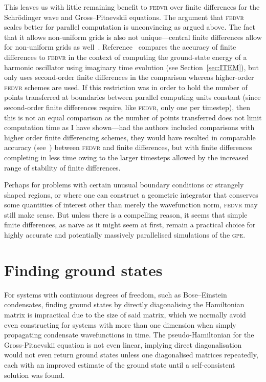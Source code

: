 This leaves us with little remaining benefit to \textsc{fedvr} over finite differences for the Schr\"odinger wave and Gross--Pitaevskii equations. The argument that \textsc{fedvr} scales better for parallel computation is unconvincing as argued above. The fact that it allows non-uniform grids is also not unique---central finite differences allow for non-uniform grids as well~\cite{fornberg_generation_1988}. Reference~\cite{schneider_parallel_2006} compares the accuracy of finite differences to \textsc{fedvr} in the context of computing the ground-state energy of a harmonic oscillator using imaginary time evolution (see Section~\ref{sec:ITEM}), but only uses second-order finite differences in the comparison whereas higher-order \textsc{fedvr} schemes are used. If this restriction was in order to hold the number of points transferred at boundaries between parallel computing units constant (since second-order finite differences require, like \textsc{fedvr}, only one per timestep), then this is not an equal comparison as the number of points transferred does not limit computation time as I have shown---had the authors included comparisons with higher order finite differencing schemes, they would have resulted in comparable accuracy (see~) between \textsc{fedvr} and finite differences, but with finite differences completing in less time owing to the larger timesteps allowed by the increased range of stability of finite differences.

Perhaps for problems with certain unusual boundary conditions or strangely shaped regions, or where one can construct a geometric integrator that conserves some quantities of interest other than merely the wavefunction norm, \textsc{fedvr} may still make sense. But unless there is a compelling reason, it seems that simple finite differences, as na\"ive as it might seem at first, remain a practical choice for highly accurate and potentially massively parallelised simulations of the \textsc{gpe}.

\section{Finding ground states}

For systems with continuous degrees of freedom, such as Bose--Einstein condensates, finding ground states by directly diagonalising the Hamiltonian matrix is impractical due to the size of said matrix, which we normally avoid even constructing for systems with more than one dimension when simply propagating condensate wavefunctions in time. The pseudo-Hamiltonian for the Gross-Pitaevskii equation is not even linear, implying direct diagonalisation would not even return ground states unless one diagonalised matrices repeatedly, each with an improved estimate of the ground state until a self-consistent solution was found.

